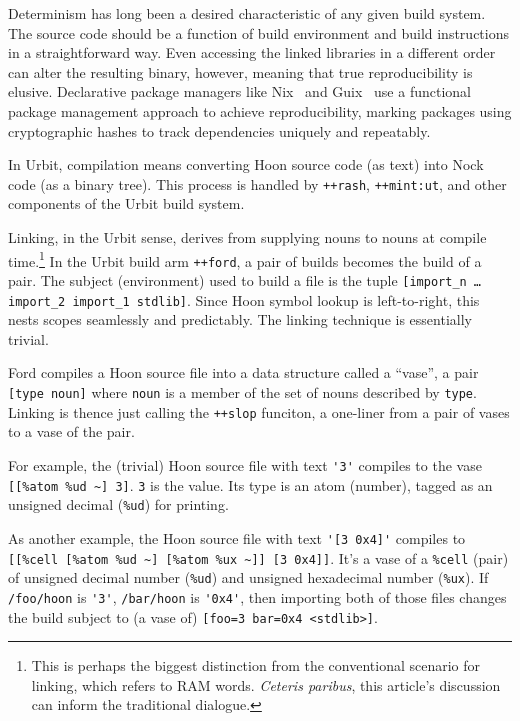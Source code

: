 \documentclass[twoside]{article}
\begin{document}
Determinism has long been a desired characteristic of any given build system.  The source code should be a function of build environment and build instructions in a straightforward way.  Even accessing the linked libraries in a different order can alter the resulting binary, however, meaning that true reproducibility is elusive.  Declarative package managers like Nix \citep{Nix}~and Guix \citep{Guix}~use a functional package management approach to achieve reproducibility, marking packages using cryptographic hashes to track dependencies uniquely and repeatably.

In Urbit, compilation means converting Hoon source code (as text) into Nock code (as a binary tree).  This process is handled by \lstinline[style=inlinecode]{++rash}, \lstinline[style=inlinecode]{++mint:ut}, and other components of the Urbit build system.

Linking, in the Urbit sense, derives from supplying nouns to nouns at compile time.\footnote{This is perhaps the biggest distinction from the conventional scenario for linking, which refers to RAM words.  \emph{Ceteris paribus}, this article's discussion can inform the traditional dialogue.}  In the Urbit build arm \lstinline[style=inlinecode]{++ford}, a pair of builds becomes the build of a pair.  The subject (environment) used to build a file is the tuple \lstinline[style=inlinecode]{[import_n … import_2 import_1 stdlib]}.  Since Hoon symbol lookup is left-to-right, this nests scopes seamlessly and predictably.  The linking technique is essentially trivial.

Ford compiles a Hoon source file into a data structure called a “vase”, a pair \lstinline[style=inlinecode]{[type noun]} where \lstinline[style=inlinecode]{noun} is a member of the set of nouns described by \lstinline[style=inlinecode]{type}.  Linking is thence just calling the \lstinline[style=inlinecode]{++slop} funciton, a one-liner from a pair of vases to a vase of the pair.

For example, the (trivial) Hoon source file with text \lstinline[style=inlinecode]{'3'} compiles to the vase \lstinline[style=inlinecode]{[[%atom %ud ~] 3]}.  \lstinline[style=inlinecode]{3} is the value.  Its type is an atom (number), tagged as an unsigned decimal (\lstinline[style=inlinecode]{%ud}) for printing.

As another example, the Hoon source file with text \lstinline[style=inlinecode]{'[3 0x4]'} compiles to \lstinline[style=inlinecode]{[[%cell [%atom %ud ~] [%atom %ux ~]] [3 0x4]]}.  It's a vase of a \lstinline[style=inlinecode]{%cell} (pair) of unsigned decimal number (\lstinline[style=inlinecode]{%ud}) and unsigned hexadecimal number (\lstinline[style=inlinecode]{%ux}).  If \lstinline[style=inlinecode]{/foo/hoon} is \lstinline[style=inlinecode]{'3'}, \lstinline[style=inlinecode]{/bar/hoon} is \lstinline[style=inlinecode]{'0x4'}, then importing both of those files changes the build subject to (a vase of) \lstinline[style=inlinecode]{[foo=3 bar=0x4 <stdlib>]}.
\end{document}
